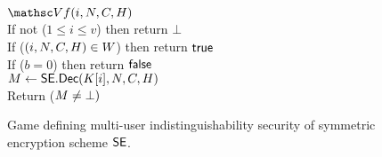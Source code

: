 \begin{figure} [t]
{
\underline{$\VfO(i,\iv,\ciph,\header)$}\\[2pt]
If not ($1\leq i\leq v$) then return $\bot$ \\
If ($(i,N,C,H) \in W$) then return $\mathsf{true}$ \\ 
If ($b=0$) then return $\mathsf{false}$ \\
$M \gets \mathsf{SE}.\mathsf{Dec}(K[i],N,C,H)$ \\
Return ($M\neq\bot)$ \medskip


}
\vspace{-2ex}
\caption{Game defining multi-user indistinguishability security of symmetric encryption scheme $\mathsf{SE}$.}
\label{fig-se-mu-ind}
\hrulefill
\end{figure}

